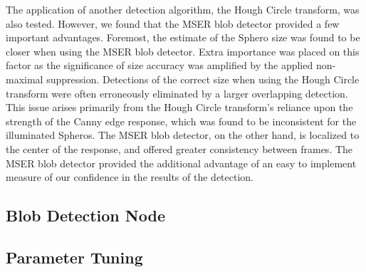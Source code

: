 The application of another detection algorithm, the Hough Circle transform, was also tested. However, we found that the MSER
blob detector provided a few important advantages. Foremost, the estimate of the Sphero size was found to be closer when
using the MSER blob detector. Extra importance was placed on this factor as the significance of size accuracy was amplified by
the applied non-maximal suppression. Detections of the correct size when using the Hough Circle transform were often
erroneously eliminated by a larger overlapping detection. This issue arises primarily from the Hough Circle transform's reliance
upon the strength of the Canny edge response, which was found to be inconsistent for the illuminated Spheros. The MSER blob
detector, on the other hand, is localized to the center of the response, and offered greater consistency between frames. The
MSER blob detector provided the additional advantage of an easy to implement measure of our confidence in the results of the
detection.

\subsection{Blob Detection Node}

\subsection{Parameter Tuning}